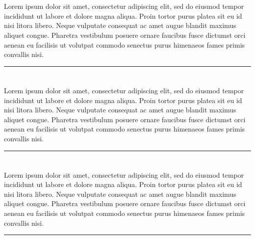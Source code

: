 \documentclass[12pt, letterpaper]{article}
\begin{document}
\section*{}
\noindent Lorem ipsum dolor sit amet, consectetur adipiscing elit, sed do eiusmod tempor incididunt ut labore et dolore magna aliqua. Proin tortor purus platea sit eu id nisi litora libero. Neque vulputate consequat ac amet augue blandit maximus aliquet congue. Pharetra vestibulum posuere ornare faucibus fusce dictumst orci aenean eu facilisis ut volutpat commodo senectus purus himenaeos fames primis convallis nisi.

\rule{\textwidth}{0.5pt}

\section*{}
\noindent Lorem ipsum dolor sit amet, consectetur adipiscing elit, sed do eiusmod tempor incididunt ut labore et dolore magna aliqua. Proin tortor purus platea sit eu id nisi litora libero. Neque vulputate consequat ac amet augue blandit maximus aliquet congue. Pharetra vestibulum posuere ornare faucibus fusce dictumst orci aenean eu facilisis ut volutpat commodo senectus purus himenaeos fames primis convallis nisi.

\rule{\textwidth}{0.5pt}

\section*{}
\noindent Lorem ipsum dolor sit amet, consectetur adipiscing elit, sed do eiusmod tempor incididunt ut labore et dolore magna aliqua. Proin tortor purus platea sit eu id nisi litora libero. Neque vulputate consequat ac amet augue blandit maximus aliquet congue. Pharetra vestibulum posuere ornare faucibus fusce dictumst orci aenean eu facilisis ut volutpat commodo senectus purus himenaeos fames primis convallis nisi.

\rule{\textwidth}{0.5pt}

\printbibliography[title={\centering References}]
\end{document}
